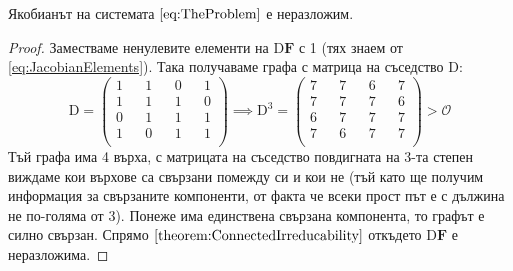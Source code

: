 \begin{proposition}
  Якобианът на системата $\ref{eq:TheProblem}$ е неразложим.
\end{proposition}
\begin{proof}
  Заместваме ненулевите елементи на $\mathrm{D} \mathbf{F}$ с 1 (тях знаем от \ref{eq:JacobianElements}). Така получаваме графа с матрица на съседство $\mathrm{D}$:
  \begin{equation}
    \mathrm{D} =
    \begin{pmatrix}
      1 && 1 && 0 && 1 \\
      1 && 1 && 1 && 0 \\
      0 && 1 && 1 && 1 \\
      1 && 0 && 1 && 1 \\
    \end{pmatrix}
    \implies
    \mathrm{D}^3 =
    \begin{pmatrix}
      7 && 7 && 6 && 7 \\
      7 && 7 && 7 && 6 \\
      6 && 7 && 7 && 7 \\
      7 && 6 && 7 && 7 \\
    \end{pmatrix}
    >
    \mathscr{O}
  \end{equation}
  Тъй графа има 4 върха, с матрицата на съседство повдигната на 3-та степен виждаме кои върхове са свързани помежду си и кои не (тъй като ще получим информация за свързаните компоненти, от факта че всеки прост път е с дължина не по-голяма от 3).
  Понеже има единствена свързана компонента, то графът е силно свързан.
  Спрямо $\ref{theorem:ConnectedIrreducability}$ откъдето $\mathrm{D}\mathbf{F}$ е неразложима.
  \end{proof}

